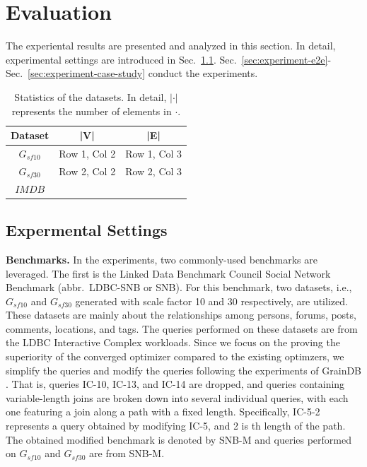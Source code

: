 \section{Evaluation}
The experiental results are presented and analyzed in this section.
In detail, experimental settings are introduced in Sec.~\ref{sec:experiment-settings}.
Sec.~\ref{sec:experiment-e2e}-Sec.~\ref{sec:experiment-case-study} conduct the experiments.

\begin{table}[h]
    \centering
    \begin{tabular}{c|c|c}
    \hline
    Dataset & |V| & |E| \\ 
    \hline
    $G_{sf10}$& Row 1, Col 2 & Row 1, Col 3 \\
    \hline
    $G_{sf30}$ & Row 2, Col 2 & Row 2, Col 3 \\
    \hline
    $IMDB$ & & \\
    \hline
    \end{tabular}
    \caption{Statistics of the datasets. In detail, $|\cdot|$ represents the number of elements in $\cdot$.}
    \label{table:experiment-datasets}
\end{table}

\subsection{Expermental Settings}
\label{sec:experiment-settings}

\textbf{Benchmarks.} In the experiments, two commonly-used benchmarks are leveraged.
The first is the Linked Data Benchmark Council Social Network Benchmark (abbr.~LDBC-SNB or SNB).
For this benchmark, two datasets, i.e., $G_{sf10}$ and $G_{sf30}$ generated with scale factor 10 and 30 respectively, are utilized.
These datasets are mainly about the relationships among persons, forums, posts, comments, locations, and tags.
The queries performed on these datasets are from the LDBC Interactive Complex workloads.
Since we focus on the proving the superiority of the converged optimizer compared to the existing optimzers, we simplify the queries and modify the queries following the experiments of GrainDB \cite{graindb}.
That is, queries IC-10, IC-13, and IC-14 are dropped, and queries containing variable-length joins are broken down into several individual queries, with each one featuring a join along a path with a fixed length.
Specifically, IC-5-2 represents a query obtained by modifying IC-5, and 2 is th length of the path.
The obtained modified benchmark is denoted by SNB-M and queries performed on $G_{sf10}$ and $G_{sf30}$ are from SNB-M.

